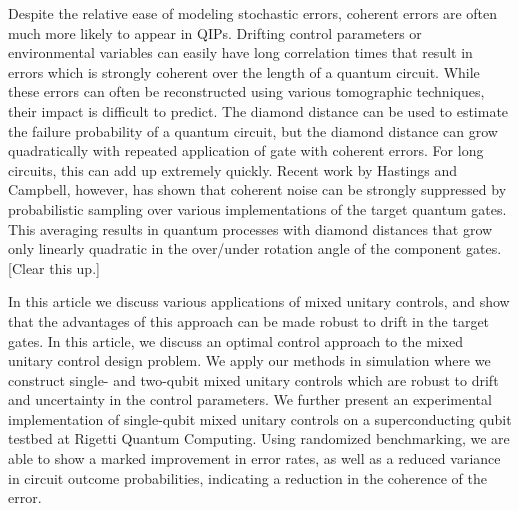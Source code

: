 \documentclass[aps,nofootinbib,pra,notitlepage,twocolumn]{revtex4-1}
\newcommand{\note}[1]{{\color{red}[#1]}}
\begin{document}
Despite the relative ease of modeling stochastic errors, coherent errors are often much more likely to appear in QIPs. Drifting control parameters or environmental variables can easily have long correlation times that result in errors which is strongly coherent over the length of a quantum circuit. While these errors can often be reconstructed using various tomographic techniques, their impact is difficult to predict. The diamond distance can be used to estimate the failure probability of a quantum circuit, but the diamond distance can grow quadratically with repeated application of gate with coherent errors. For long circuits, this can add up extremely quickly. Recent work by Hastings and Campbell, however, has shown that coherent noise can be strongly suppressed by probabilistic sampling over various implementations of the target quantum gates. This averaging results in quantum processes with diamond distances that grow only linearly  quadratic in the over/under rotation angle of the component gates. \note{Clear this up.}

In this article we discuss various applications of mixed unitary controls, and show that the advantages of this approach can be made robust to drift in the target gates. In this article, we discuss an optimal control approach to the mixed unitary control design problem.  We apply our methods in simulation where we construct single- and two-qubit mixed unitary controls which are robust to drift and uncertainty in the control parameters. We further present an experimental implementation of single-qubit mixed unitary controls on a superconducting qubit testbed at Rigetti Quantum Computing. Using randomized benchmarking, we are able to show a marked improvement in error rates, as well as a reduced variance in circuit outcome probabilities, indicating a reduction in the coherence of the error.



\end{document}
